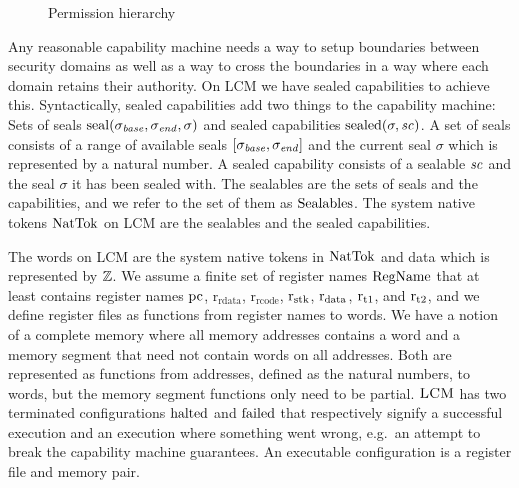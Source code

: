 \documentclass[acmsmall,review,anonymous]{acmart}\settopmatter{printfolios=true,printccs=false,printacmref=false}
\renewcommand{\RegName}{\shareddom{RegName}}
\renewcommand{\SealableCaps}{\shareddom{Sealables}}
\renewcommand{\Cap}{\shareddom{NatTok}}
\renewcommand{\rretc}{\mathrm{r}_{\mathrm{rcode}}}
\renewcommand{\rretd}{\mathrm{r}_{\mathrm{rdata}}}
\newcommand{\trgcm}{\textsc{LCM}}
\begin{document}
\begin{wrapfigure}{r}{0.33\linewidth}
  \centering

  \caption{Permission hierarchy}
  \label{fig:perm-hier}
\end{wrapfigure}

Any reasonable capability machine needs a way to setup boundaries between security domains as well as a way to cross the boundaries in a way where each domain retains their authority.
On \trgcm{} we have sealed capabilities to achieve this.
Syntactically, sealed capabilities add two things to the capability machine: Sets of seals $\mathrm{seal}(\sigma_{\mathit{base}},\sigma_{\mathit{end}},\sigma)$ and sealed capabilities $\mathrm{sealed}(\sigma,\mathit{sc})$.
A set of seals consists of a range of available seals $[\sigma_{\mathit{base}},\sigma_{\mathit{end}}]$ and the current seal $\sigma$ which is represented by a natural number.
A sealed capability consists of a sealable $\mathit{sc}$ and the seal $\sigma$ it has been sealed with.
The sealables are the sets of seals and the capabilities, and we refer to the set of them as $\SealableCaps$.
The system native tokens $\Cap$ on \trgcm{} are the sealables and the sealed capabilities.

The words on \trgcm{} are the system native tokens in $\Cap$ and data which is represented by $\mathbb{Z}$.
We assume a finite set of register names $\RegName$ that at least contains register names $\mathrm{pc}$, $\rretd$, $\rretc$, $\mathrm{r}_\mathrm{stk}$, $\mathrm{r}_\mathrm{data}$, $\mathrm{r}_\mathrm{t1}$, and $\mathrm{r}_\mathrm{t2}$, and we define register files as functions from register names to words.
We have a notion of a complete memory where all memory addresses contains a word and a memory segment that need not contain words on all addresses.
Both are represented as functions from addresses, defined as the natural numbers, to words, but the memory segment functions only need to be partial.
$\trgcm{}$ has two terminated configurations $\mathrm{halted}$ and $\mathrm{failed}$ that respectively signify a successful execution and an execution where something went wrong, e.g.\ an attempt to break the capability machine guarantees.
An executable configuration is a register file and memory pair.
\end{document}
